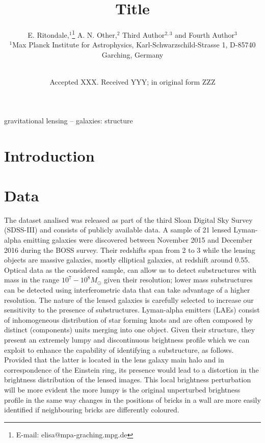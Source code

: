 \documentclass[a4paper,fleqn,usenatbib]{mnras}
\title[Short title]{Title}
\author[E. Ritondale et al.]{
E. Ritondale,$^{1}$\thanks{E-mail: elisa@mpa-graching.mpg.de}
A. N. Other,$^{2}$
Third Author$^{2,3}$
and Fourth Author$^{3}$
\\
$^{1}$Max Planck Institute for Astrophysics, Karl-Schwarzschild-Strasse 1, D-85740 Garching, Germany\\\\
}
\date{Accepted XXX. Received YYY; in original form ZZZ}
\begin{document}
\label{firstpage}
\pagerange{\pageref{firstpage}--\pageref{lastpage}}
\maketitle

\label{firstpage}

\begin{abstract}

\end{abstract}

\begin{keywords}
gravitational lensing -- galaxies: structure 
\end{keywords}



\section{Introduction}

\section{Data}
The dataset analised was released as part of the third Sloan Digital Sky Survey (SDSS-III) and consists of publicly available data. A sample of 21 lensed Lyman-alpha emitting galaxies were discovered between November 2015 and December 2016 during the BOSS survey. Their redshifts span from 2 to 3 while the lensing objects are massive galaxies, mostly elliptical galaxies, at redshift around 0.55.
Optical data as the considered sample, can allow us to detect substructures with mass in the range $10^7 - 10^8 M_{\odot}$ given their resolution; lower mass substructures can be detected using interferometric data that can take advantage of a higher resolution.
The nature of the lensed galaxies is carefully selected to increase our sensitivity to the presence of substructures. Lyman-alpha emitters (LAEs) consist of inhomogeneous distribution of star forming knots and are often composed by distinct (components) units merging into one object. Given their structure, they present an extremely lumpy and discontinuous brightness profile which we can exploit to enhance the capability of identifying a substructure, as follows. Provided that the latter is located in the lens galaxy main halo and in correspondence of the Einstein ring, its presence would lead to a distortion in the brightness distribution of the lensed images. This local brightness perturbation will be more evident the more lumpy is the original unperturbed brightness profile in the same way changes in the positions of bricks in a wall are more easily identified if neighbouring bricks are differently coloured.
\end{document}
